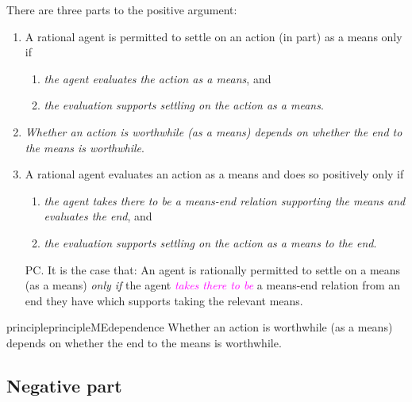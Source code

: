 \documentclass[10pt]{article}
\begin{document}
There are three parts to the positive argument:
\begin{enumerate}[label=P\arabic*., ref=(P\arabic*)]
\item\label{premise:positive:evaluate-means} A rational agent is permitted to settle on an action (in part) as a means only if
  \begin{enumerate}[label=P\arabic{enumi}\alph*., ref=(P\arabic{enumi}\alph*)]
  \item\label{premise:positive:evaluate-means:evaluate} \emph{the agent evaluates the action as a means}, and
  \item\label{premise:positive:evaluate-means:supports} \emph{the evaluation supports settling on the action as a means}.
  \end{enumerate}
\item\label{premise:positive:principle-dependency} \emph{Whether an action is worthwhile (as a means) depends on whether the end to the means is worthwhile}.
\item\label{premise:positive:evaluate-end} A rational agent evaluates an action as a means and does so positively only if
  \begin{enumerate}[label=P\arabic{enumi}\alph*., ref=(P\arabic{enumi}\alph*)]
  \item \emph{the agent takes there to be a means-end relation supporting the means and evaluates the end}, and
  \item \emph{the evaluation supports settling on the action as a means to the end}.
  \end{enumerate}
\end{enumerate}

\begin{enumerate}[label=P\arabic*., ref=(P\arabic*), resume]
\item[PC.] It is the case that:
  An agent is rationally permitted to settle on a means (as a means)  \emph{only if} the agent \textcolor{fuchsia}{\emph{takes there to be}} a means-end relation from an end they have which supports taking the relevant means.
\end{enumerate}

\begin{restatable}{principle}{principleMEdependence}\label{principle:dependence}
  Whether an action is worthwhile (as a means) depends on whether the end to the means is worthwhile.
\end{restatable}

\newpage

\subsection{Negative part}
\label{sec:negative-part}
\end{document}
